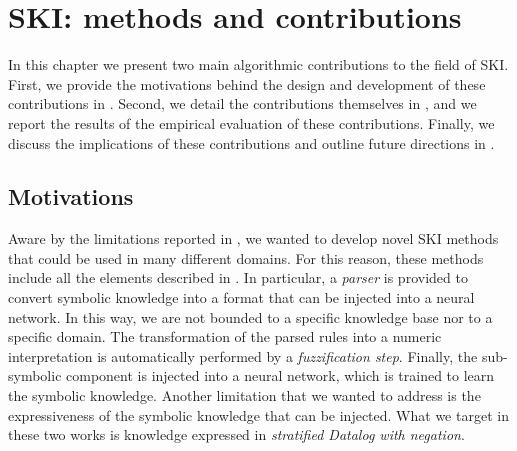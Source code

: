 
\chapter{SKI: methods and contributions}
\label{ch:ski-methods-and-contributions}
\minitoc

In this chapter we present two main algorithmic contributions to the field of \gls{SKI}.
%
First, we provide the motivations behind the design and development of these contributions in .
%
Second, we detail the contributions themselves in , and we report the results of the empirical evaluation of these contributions.
%
Finally, we discuss the implications of these contributions and outline future directions in .


\section{Motivations}\label{sec:ski-motivations}
%
Aware by the limitations reported in , we wanted to develop novel \gls{SKI} methods that could be used in many different domains.
%
For this reason, these methods include all the elements described in .
%
In particular, a \emph{parser} is provided to convert symbolic knowledge into a format that can be injected into a neural network.
%
In this way, we are not bounded to a specific knowledge base nor to a specific domain.
%
The transformation of the parsed rules into a numeric interpretation is automatically performed by a \emph{fuzzification step}.
%
Finally, the sub-symbolic component is injected into a neural network, which is trained to learn the symbolic knowledge.
%
Another limitation that we wanted to address is the expressiveness of the symbolic knowledge that can be injected.
%
What we target in these two works is knowledge expressed in \emph{stratified Datalog with negation}.


